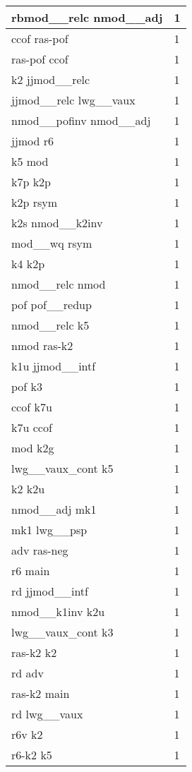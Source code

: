 \documentclass[a4 paper]{article}
\begin{document}
\begin{longtable}{p{}p{}}
rbmod\_\_relc nmod\_\_adj  & 1 \\ \midrule
ccof ras-pof  & 1 \\ \midrule
ras-pof ccof  & 1 \\ \midrule
k2 jjmod\_\_relc  & 1 \\ \midrule
jjmod\_\_relc lwg\_\_vaux  & 1 \\ \midrule
nmod\_\_pofinv nmod\_\_adj  & 1 \\ \midrule
jjmod r6  & 1 \\ \midrule
k5 mod  & 1 \\ \midrule
k7p k2p  & 1 \\ \midrule
k2p rsym  & 1 \\ \midrule
k2s nmod\_\_k2inv  & 1 \\ \midrule
mod\_\_wq rsym  & 1 \\ \midrule
k4 k2p  & 1 \\ \midrule
nmod\_\_relc nmod  & 1 \\ \midrule
pof pof\_\_redup  & 1 \\ \midrule
nmod\_\_relc k5  & 1 \\ \midrule
nmod ras-k2  & 1 \\ \midrule
k1u jjmod\_\_intf  & 1 \\ \midrule
pof k3  & 1 \\ \midrule
ccof k7u  & 1 \\ \midrule
k7u ccof  & 1 \\ \midrule
mod k2g  & 1 \\ \midrule
lwg\_\_vaux\_cont k5  & 1 \\ \midrule
k2 k2u  & 1 \\ \midrule
nmod\_\_adj mk1  & 1 \\ \midrule
mk1 lwg\_\_psp  & 1 \\ \midrule
adv ras-neg  & 1 \\ \midrule
r6 main  & 1 \\ \midrule
rd jjmod\_\_intf  & 1 \\ \midrule
nmod\_\_k1inv k2u  & 1 \\ \midrule
lwg\_\_vaux\_cont k3  & 1 \\ \midrule
ras-k2 k2  & 1 \\ \midrule
rd adv  & 1 \\ \midrule
ras-k2 main  & 1 \\ \midrule
rd lwg\_\_vaux  & 1 \\ \midrule
r6v k2  & 1 \\ \midrule
r6-k2 k5  & 1 \\ \midrule

\end{longtable}
\end{document}
